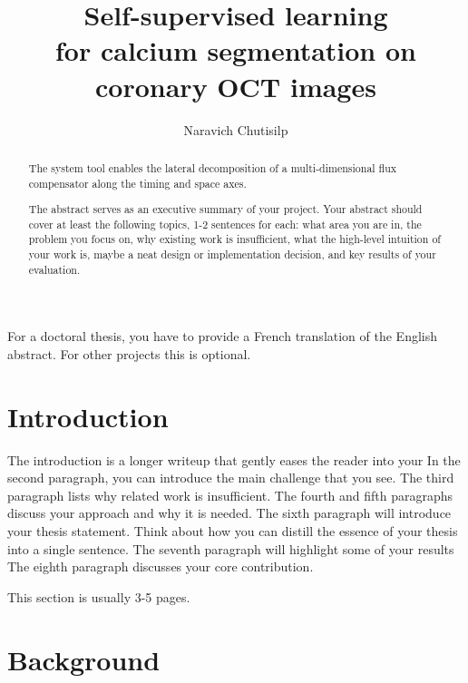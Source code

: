 \documentclass[a4paper,11pt,oneside]{report}
\title{Self-supervised learning\\for calcium segmentation on coronary OCT images}
\author{Naravich Chutisilp}
\begin{document}
\maketitle
\makededication
\makeacks

\begin{abstract}
The system tool enables the lateral decomposition of a multi-dimensional
flux compensator along the timing and space axes.

The abstract serves as an executive summary of your project.
Your abstract should cover at least the following topics, 1-2 sentences for
each: what area you are in, the problem you focus on, why existing work is
insufficient, what the high-level intuition of your work is, maybe a neat
design or implementation decision, and key results of your evaluation.
\end{abstract}

\begin{frenchabstract}
For a doctoral thesis, you have to provide a French translation of the
English abstract. For other projects this is optional.
\end{frenchabstract}

\maketoc

\chapter{Introduction}

The introduction is a longer writeup that gently eases the reader into your
In the second paragraph, you can introduce the main challenge that you see.
The third paragraph lists why related work is insufficient.
The fourth and fifth paragraphs discuss your approach and why it is needed.
The sixth paragraph will introduce your thesis statement. Think about how you can
distill the essence of your thesis into a single sentence.
The seventh paragraph will highlight some of your results
The eighth paragraph discusses your core contribution.

This section is usually 3-5 pages.

\chapter{Background}

\end{document}
